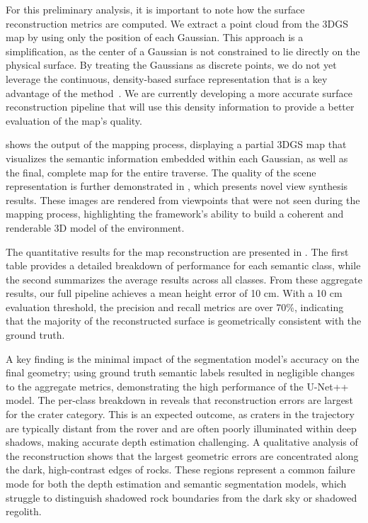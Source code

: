 For this preliminary analysis, it is important to note how the surface reconstruction metrics are computed. We extract a point cloud from the 3DGS map by using only the position of each Gaussian. This approach is a simplification, as the center of a Gaussian is not constrained to lie directly on the physical surface. By treating the Gaussians as discrete points, we do not yet leverage the continuous, density-based surface representation that is a key advantage of the method~\cite{wolf_gs2mesh_2025}. We are currently developing a more accurate surface reconstruction pipeline that will use this density information to provide a better evaluation of the map's quality.

 shows the output of the mapping process, displaying a partial 3DGS map that visualizes the semantic information embedded within each Gaussian, as well as the final, complete map for the entire traverse. The quality of the scene representation is further demonstrated in , which presents novel view synthesis results. These images are rendered from viewpoints that were not seen during the mapping process, highlighting the framework's ability to build a coherent and renderable 3D model of the environment.

The quantitative results for the map reconstruction are presented in . The first table provides a detailed breakdown of performance for each semantic class, while the second summarizes the average results across all classes. From these aggregate results, our full pipeline achieves a mean height error of 10 cm. With a 10 cm evaluation threshold, the precision and recall metrics are over 70\%, indicating that the majority of the reconstructed surface is geometrically consistent with the ground truth.

A key finding is the minimal impact of the segmentation model's accuracy on the final geometry; using ground truth semantic labels resulted in negligible changes to the aggregate metrics, demonstrating the high performance of the U-Net++ model. The per-class breakdown in  reveals that reconstruction errors are largest for the crater category. This is an expected outcome, as craters in the trajectory are typically distant from the rover and are often poorly illuminated within deep shadows, making accurate depth estimation challenging.
A qualitative analysis of the reconstruction shows that the largest geometric errors are concentrated along the dark, high-contrast edges of rocks. These regions represent a common failure mode for both the depth estimation and semantic segmentation models, which struggle to distinguish shadowed rock boundaries from the dark sky or shadowed regolith.

